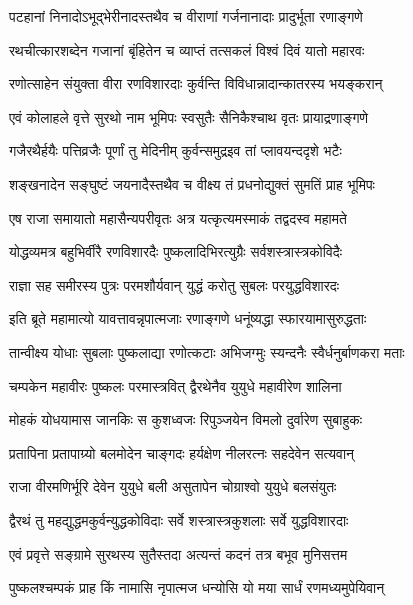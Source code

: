 \twolineshloka
{पटहानां निनादोऽभूद्भेरीनादस्तथैव च}
{वीराणां गर्जनानादाः प्रादुर्भूता रणाङ्गणे}%

\twolineshloka
{रथचीत्कारशब्देन गजानां बृंहितेन च}
{व्याप्तं तत्सकलं विश्वं दिवं यातो महारवः}%

\twolineshloka
{रणोत्साहेन संयुक्ता वीरा रणविशारदाः}
{कुर्वन्ति विविधान्नादान्कातरस्य भयङ्करान्}%

\twolineshloka
{एवं कोलाहले वृत्ते सुरथो नाम भूमिपः}
{स्वसुतैः सैनिकैश्चाथ वृतः प्रायाद्रणाङ्गणे}%

\twolineshloka
{गजैरथैर्हयैः पत्तिव्रजैः पूर्णां तु मेदिनीम्}
{कुर्वन्समुद्रइव तां प्लावयन्ददृशे भटैः}%

\twolineshloka
{शङ्खनादेन सङ्घुष्टं जयनादैस्तथैव च}
{वीक्ष्य तं प्रधनोद्युक्तं सुमतिं प्राह भूमिपः}%


\twolineshloka
{एष राजा समायातो महासैन्यपरीवृतः}
{अत्र यत्कृत्यमस्माकं तद्वदस्व महामते}%


\twolineshloka
{योद्धव्यमत्र बहुभिर्वीरै रणविशारदैः}
{पुष्कलादिभिरत्युग्रैः सर्वशस्त्रास्त्रकोविदैः}%

\twolineshloka
{राज्ञा सह समीरस्य पुत्रः परमशौर्यवान्}
{युद्धं करोतु सुबलः परयुद्धविशारदः}%


\twolineshloka
{इति ब्रूते महामात्यो यावत्तावन्नृपात्मजाः}
{रणाङ्गणे धनूंष्यद्धा स्फारयामासुरुद्धताः}%

\twolineshloka
{तान्वीक्ष्य योधाः सुबलाः पुष्कलाद्या रणोत्कटाः}
{अभिजग्मुः स्यन्दनैः स्वैर्धनुर्बाणकरा मताः}%

\twolineshloka
{चम्पकेन महावीरः पुष्कलः परमास्त्रवित्}
{द्वैरथेनैव युयुधे महावीरेण शालिना}%

\twolineshloka
{मोहकं योधयामास जानकिः स कुशध्वजः}
{रिपुञ्जयेन विमलो दुर्वारेण सुबाहुकः}%

\twolineshloka
{प्रतापिना प्रतापाग्र्यो बलमोदेन चाङ्गदः}
{हर्यक्षेण नीलरत्नः सहदेवेन सत्यवान्}%

\twolineshloka
{राजा वीरमणिर्भूरि देवेन युयुधे बली}
{असुतापेन चोग्राश्वो युयुधे बलसंयुतः}%

\twolineshloka
{द्वैरथं तु महद्युद्धमकुर्वन्युद्धकोविदाः}
{सर्वे शस्त्रास्त्रकुशलाः सर्वे युद्धविशारदाः}%

\twolineshloka
{एवं प्रवृत्ते सङ्ग्रामे सुरथस्य सुतैस्तदा}
{अत्यन्तं कदनं तत्र बभूव मुनिसत्तम}%

\twolineshloka
{पुष्कलश्चम्पकं प्राह किं नामासि नृपात्मज}
{धन्योसि यो मया सार्धं रणमध्यमुपेयिवान्}%


